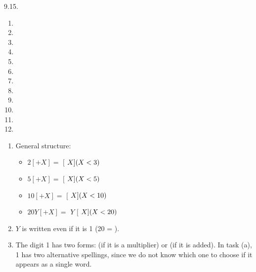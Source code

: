 \begin{refsection}
\begin{practiceproblemsolution}{9.15. \langnameChabu}
\begin{solutions}[label=Solution 9.15\alph*]
    \item
    \begin{multicols}{2}
        \begin{enumerate}
            \item {}
            \item {}
            \item {}
            \item {}
            \item {}
            \item {}
            \item[10] 
            \item[12] 
            \item[15] 
            \item[20] 
            \item[30] 
            \item[]
        \end{enumerate}
    \end{multicols}
\end{solutions}

\begin{enumerate}
    \item General structure:
\begin{itemize}
    \item $2 [+ X] =$  $[$ $X] \hfill (X < 3)$
    \item $5 [+ X] =$  $[$ $X] \hfill (X < 5)$
    \pagebreak
    \item $10 [+ X] =$  $[$ $X] \hfill (X < 10)$
    \item $20Y [+ X] =$ $Y$  $[$ $X] \hfill (X < 20)$
\end{itemize}
\item $Y$ is written even if it is 1 (20 = ).
\item The digit 1 has two forms:  (if it is a multiplier) or  (if it is added). In task (a), 1 has two alternative spellings, since we do not know which one to choose if it appears as a single word.
\end{enumerate}
\end{practiceproblemsolution}


\end{refsection}
